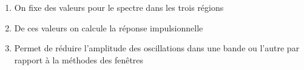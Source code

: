 \documentclass{beamer}
\begin{document}
\begin{frame}
\begin{center}
\begin{tikzpicture}
\end{tikzpicture}
\end{center}
\vspace{0.3cm}

\vspace{0.1cm}
\begin{enumerate}
\item<2-> On fixe des valeurs pour le spectre dans les trois régions
\vspace{0.2cm} 
\item<3-> De ces valeurs on calcule la réponse impulsionnelle
\vspace{0.2cm} 
\item<4-> Permet de réduire l'amplitude des oscillations dans une bande ou l'autre par rapport à la méthodes des fenêtres
\end{enumerate}


\end{frame}
\end{document}
